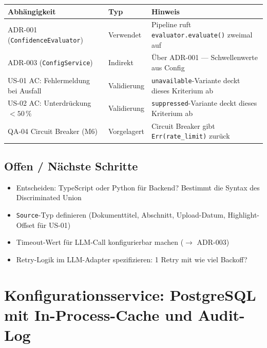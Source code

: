 \documentclass[a4paper, 11pt, oneside]{report}
\newcommand{\code}[1]{\texttt{\small #1}}
\newcommand{\ra}{$\rightarrow$\xspace}
\newcommand{\todo}{$\square$\;}
\begin{document}
\begin{table}[htb]
\small\centering
\begin{tabularx}{\linewidth}{L{4cm} L{3cm} X}
\toprule
{}
\textbf{Abhängigkeit} & \textbf{Typ} & \textbf{Hinweis} \\
\midrule
ADR-001 (\code{ConfidenceEvaluator}) & Verwendet   & Pipeline ruft \code{evaluator.evaluate()} zweimal auf \\
ADR-003 (\code{ConfigService})       & Indirekt    & Über ADR-001 --- Schwellenwerte aus Config \\
US-01 AC: Fehlermeldung bei Ausfall  & Validierung & \code{unavailable}-Variante deckt dieses Kriterium ab \\
US-02 AC: Unterdrückung $< 50\,\%$  & Validierung & \code{suppressed}-Variante deckt dieses Kriterium ab \\
QA-04 Circuit Breaker (M6)           & Vorgelagert & Circuit Breaker gibt \code{Err(rate\_limit)} zurück \\
\bottomrule
\end{tabularx}
\end{table}

\section{Offen / Nächste Schritte}

\begin{itemize}[label=\todo]
  \item Entscheiden: TypeScript oder Python für Backend? Bestimmt die Syntax des
        Discriminated Union
  \item \code{Source}-Typ definieren (Dokumenttitel, Abschnitt, Upload-Datum,
        Highlight-Offset für US-01)
  \item Timeout-Wert für LLM-Call konfigurierbar machen (\ra ADR-003)
  \item Retry-Logik im LLM-Adapter spezifizieren: 1 Retry mit wie viel Backoff?
\end{itemize}

\chapter{Konfigurationsservice: PostgreSQL mit In-Process-Cache und Audit-Log}
\label{chap:adr003}
\end{document}
